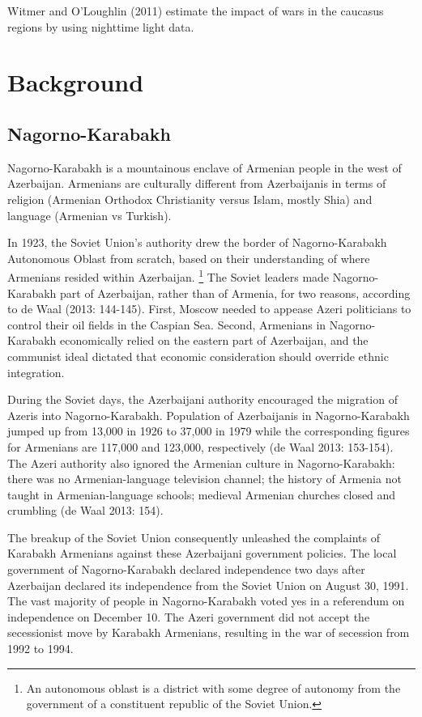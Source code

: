\documentclass[12pt,a4paper]{article}%
\begin{document}
Witmer and O'Loughlin (2011) estimate the impact of wars in the caucasus regions by using nighttime light data.

\section{Background}
\subsection{Nagorno-Karabakh}
Nagorno-Karabakh is a mountainous enclave of Armenian people in the west of Azerbaijan. Armenians are culturally different from Azerbaijanis in terms of religion (Armenian Orthodox Christianity versus Islam, mostly Shia) and language (Armenian vs Turkish). 

In 1923, the Soviet Union's authority drew the border of Nagorno-Karabakh Autonomous Oblast from scratch, based on their understanding of where Armenians resided within Azerbaijan.%
\footnote{
	An autonomous oblast is a district with some degree of autonomy from the government of a constituent republic of the Soviet Union. 
} 
The Soviet leaders made Nagorno-Karabakh part of Azerbaijan, rather than of Armenia, for two reasons, according to de Waal (2013: 144-145). First, Moscow needed to appease Azeri politicians to control their oil fields in the Caspian Sea. Second, Armenians in Nagorno-Karabakh economically relied on the eastern part of Azerbaijan, and the communist ideal dictated that economic consideration should override ethnic integration.

During the Soviet days, the Azerbaijani authority encouraged the migration of Azeris into Nagorno-Karabakh. Population of Azerbaijanis in Nagorno-Karabakh jumped up from 13,000 in 1926 to 37,000 in 1979 while the corresponding figures for Armenians are 117,000 and 123,000, respectively (de Waal 2013: 153-154). The Azeri authority also ignored the Armenian culture in Nagorno-Karabakh: there was no Armenian-language television channel; the history of Armenia not taught in Armenian-language schools; medieval Armenian churches closed and crumbling (de Waal 2013: 154).  

The breakup of the Soviet Union consequently unleashed the complaints of Karabakh Armenians against these Azerbaijani government policies. The local government of Nagorno-Karabakh declared independence two days after Azerbaijan declared its independence from the Soviet Union on August 30, 1991. The vast majority of people in Nagorno-Karabakh voted yes in a referendum on independence on December 10. The Azeri government did not accept the secessionist move by Karabakh Armenians, resulting in the war of secession from 1992 to 1994.
\end{document}
